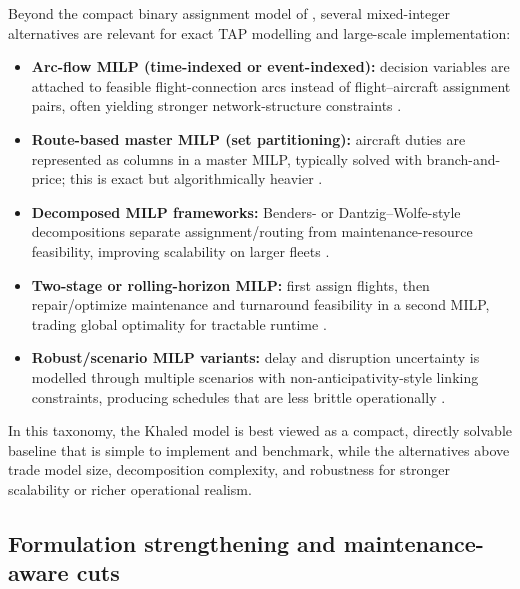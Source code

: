 Beyond the compact binary assignment model of \citet{khaled2018compact},
several mixed-integer alternatives are relevant for exact TAP modelling and
large-scale implementation:
\begin{itemize}
	\item \textbf{Arc-flow MILP (time-indexed or event-indexed):} decision
	variables are attached to feasible flight-connection arcs instead of flight--aircraft
	assignment pairs, often yielding stronger network-structure constraints
	\citep{levin1971scheduling, hane1995fleet, sherali2006airline}.
	\item \textbf{Route-based master MILP (set partitioning):} aircraft duties are
	represented as columns in a master MILP, typically solved with
	branch-and-price; this is exact but algorithmically heavier
	\citep{barnhart1998flight, sarac2006branch, klabjan2005large}.
	\item \textbf{Decomposed MILP frameworks:} Benders- or
	Dantzig--Wolfe-style decompositions separate assignment/routing from
	maintenance-resource feasibility, improving scalability on larger fleets
	\citep{cordeau2001benders, mercier2005computational, desaulniers1997daily}.
	\item \textbf{Two-stage or rolling-horizon MILP:} first assign flights, then
	repair/optimize maintenance and turnaround feasibility in a second MILP,
	trading global optimality for tractable runtime
	\citep{clarke1996maintenance, liang2011new, liang2012network}.
	\item \textbf{Robust/scenario MILP variants:} delay and disruption uncertainty
	is modelled through multiple scenarios with non-anticipativity-style linking
	constraints, producing schedules that are less brittle operationally
	\citep{borndorfer2010robust, froyland2013recoverable}.
\end{itemize}

In this taxonomy, the Khaled model is best viewed as a compact, directly
solvable baseline that is simple to implement and benchmark, while the
alternatives above trade model size, decomposition complexity, and robustness
for stronger scalability or richer operational realism.

\subsection{Formulation strengthening and maintenance-aware cuts}

